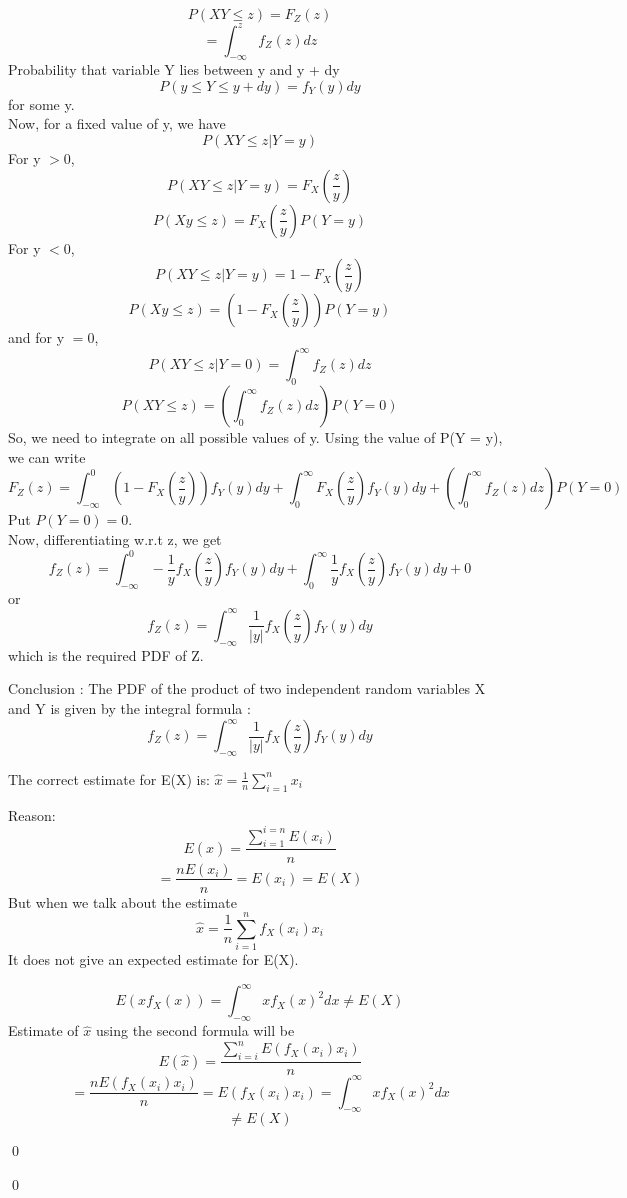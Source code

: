 \documentclass[12pt]{article}
\newenvironment{question}[1]{%
  \vspace{1em}
  \noindent{\Large\bfseries Question #1}\par\vspace{0.5em}
  \itshape
}{\par\vspace{1em}}
\newenvironment{solution}{%
  \vspace{1em}
  \noindent{\Large\bfseries Solution}\par\vspace{0.5em}
  \normalfont
}{\qed\par}
\begin{document}
\begin{solution}
\[P(XY \leq z) = F_Z(z)\]
\[= \int_{-\infty}^{z}  f_Z(z) dz\]
Probability that variable Y lies between y and y + dy
\[P(y \leq Y \leq y + dy) = f_Y(y)dy\]
for some y.\\
Now, for a fixed value of y, we have
\[P(XY \leq z | Y = y) \]
For y $> 0$,
\[P(XY \leq z | Y = y) = F_X(\frac{z}{y})\]
\[P(Xy \leq z) = F_X(\frac{z}{y}) P(Y = y)\]
For y $< 0$,
\[P(XY \leq z | Y = y) = 1 - F_X(\frac{z}{y})\]
\[P(Xy \leq z) =( 1 - F_X(\frac{z}{y})) P(Y = y)\]
and for y $= 0$,
\[P(XY \leq z | Y = 0) = \int_{0}^{\infty}f_Z(z) dz\]
\[P(XY \leq z) = (\int_{0}^{\infty}f_Z(z) dz )P(Y = 0)\]
So, we need to integrate on all possible values of y. Using the value of P(Y = y), we can write
\[F_Z(z) = \int_{-\infty}^{0} (1 - F_X(\frac{z}{y})) f_Y(y) dy + \int_{0}^{\infty} F_X(\frac{z}{y}) f_Y(y) dy + (\int_{0}^{\infty}f_Z(z) dz ) P(Y = 0)\]
Put $P(Y = 0) = 0 $.\\Now, differentiating w.r.t z, we get
\[f_Z(z) = \int_{-\infty}^{0} -\frac{1}{y} f_X(\frac{z}{y}) f_Y(y) dy + \int_{0}^{\infty} \frac{1}{y} f_X(\frac{z}{y}) f_Y(y) dy + 0\]
or
\[f_Z(z) = \int_{-\infty}^{\infty} \frac{1}{|y|} f_X(\frac{z}{y}) f_Y(y) dy\]
which is the required PDF of Z.

Conclusion : The PDF of the product of two independent random variables X and Y is given by the integral formula :
\[f_Z(z) = \int_{-\infty}^{\infty} \frac{1}{|y|} f_X(\frac{z}{y}) f_Y(y) dy\]

\begin{question}{3}
\end{question}

\begin{solution}
  The correct estimate for E(X) is: $\hat{x}  =  \frac{1}{n}\sum_{i=1}^{n} x_i$

  Reason:
  \[E(\hat{x}) = \frac{\sum_{i=1}^{i=n} E(x_i)}{n}\]
  \[= \frac{nE(x_i)}{n} = E(x_i) = E(X)\]
  But when we talk about the estimate 
  \[\hat{x} =\frac{1}{n}\sum_{i=1}^{n}f_X(x_i) x_i \]
  It does not give an expected estimate for E(X).

  \[E(xf_X(x)) = \int_{-\infty}^{\infty} x {f_X(x)}^2 dx \neq E(X)\] 
  Estimate of $\hat{x}$ using the second formula will be
  \[E(\hat{x}) = \frac{\sum_{i=i}^{n} E(f_X(x_i)x_i)}{n}\] 
  \[= \frac{nE(f_X(x_i)x_i)}{n} = E(f_X(x_i)x_i) = \int_{-\infty}^{\infty} x {f_X(x)}^2 dx\]  
  \[\neq E(X)\]


\end{solution}
\end{solution}
\end{document}
